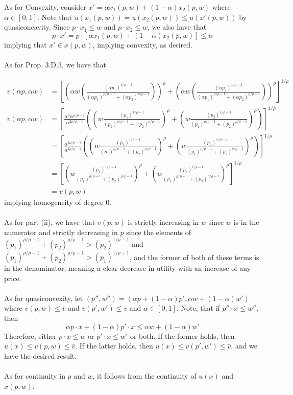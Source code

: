 \documentclass[letterpaper,12pt]{article}
\theoremstyle{definition}
\begin{document}
As for Convexity, consider $x' = \alpha x_1(p,w) + (1-\alpha) x_2(p,w)$ where $\alpha \in [0,1]$. Note that $u(x_1(p,w)) = u(x_2(p,w)) \leq u(x'(p,w)) $ by quasiconcavity. Since $p \cdot x_1 \leq w$ and $p \cdot x_2 \leq w$, we also have that 
\[p \cdot x' = p \cdot [ \alpha x_1(p,w) + (1-\alpha) x_2(p,w)] \leq w\]
implying that $x' \in x(p,w)$, implying convexity, as desired.\\\\
As for Prop. 3.D.3, we have that 

\begin{align*}
v(\alpha p,\alpha w) &= \left[ \left(\alpha w \left( \frac{(\alpha p_1)^{1/\rho-1}}{(\alpha p_1)^{\rho/\rho-1} +(\alpha p_2)^{\rho/\rho-1}} \right) \right)^\rho + \left(\alpha w \left( \frac{(\alpha p_2)^{1/\rho-1}}{(\alpha p_1)^{\rho/\rho-1} +(\alpha p_2)^{\rho/\rho-1}} \right) \right)^\rho \right]^{1/\rho}\\
v(\alpha p,\alpha w) 
&= \left[ \frac{\alpha^\rho \alpha^{\rho/\rho-1}}{\alpha^{2\rho/\rho-1}}\left( \left( w\frac{( p_1)^{1/\rho-1}}{(p_1)^{\rho/\rho-1} +( p_2)^{\rho/\rho-1}} \right) ^\rho + 
\left( w \frac{(p_2)^{1/\rho-1}}{(p_1)^{\rho/\rho-1} +(p_2)^{\rho/\rho-1}} \right)^\rho \right) \right]^{1/\rho}\\
&= \left[ \frac{\alpha^{2\rho/\rho-1}}{\alpha^{2\rho/\rho-1}}\left( \left( w\frac{( p_1)^{1/\rho-1}}{(p_1)^{\rho/\rho-1} +( p_2)^{\rho/\rho-1}} \right) ^\rho + 
\left( w \frac{(p_2)^{1/\rho-1}}{(p_1)^{\rho/\rho-1} +(p_2)^{\rho/\rho-1}} \right)^\rho \right) \right]^{1/\rho}\\
&= \left[  \left( w\frac{( p_1)^{1/\rho-1}}{(p_1)^{\rho/\rho-1} +( p_2)^{\rho/\rho-1}} \right) ^\rho + 
\left( w \frac{(p_2)^{1/\rho-1}}{(p_1)^{\rho/\rho-1} +(p_2)^{\rho/\rho-1}} \right)^\rho  \right]^{1/\rho}\\
& = v(p,w)
\end{align*} 
implying homogeneity of degree 0.\\\\


As for part (ii), we have that $v(p,w)$ is strictly increasing in $w$ since $w$ is in the numerator and strictly decreasing in $p$ since the elements of $(p_1)^{\rho/\rho-1} +(p_2)^{\rho/\rho-1} > (p_2)^{1/\rho-1}$ and $(p_1)^{\rho/\rho-1} +(p_2)^{\rho/\rho-1} > (p_1)^{1/\rho-1}$, and the former of both of these terms is in the denominator, meaning a clear decrease in utility with an increase of any price.\\\\
As for quasiconvexity,  let $(p'', w'') = (\alpha p + (1- \alpha)p', \alpha w + (1- \alpha) w')$ where $v(p,w) \leq \bar v$ and $v(p',w') \leq \bar v$ and $\alpha \in [0,1]$. Note, that if $p'' \cdot x \leq w''$, then
\[\alpha p \cdot x + (1-\alpha)p' \cdot x \leq \alpha w + (1-\alpha) w'\]
Therefore, either $p \cdot x \leq w$ or $p'\cdot x \leq w'$ or both. If the former holds, then $u(x) \leq v(p,w) \leq \bar v$. If the latter holds, then $u(x) \leq v(p',w') \leq \bar v$, and we have the desired result.\\\\
As for continuity in $p$ and $w$, it follows from the continuity of $u(x)$ and $x(p,w)$.\\\\
\end{document}
